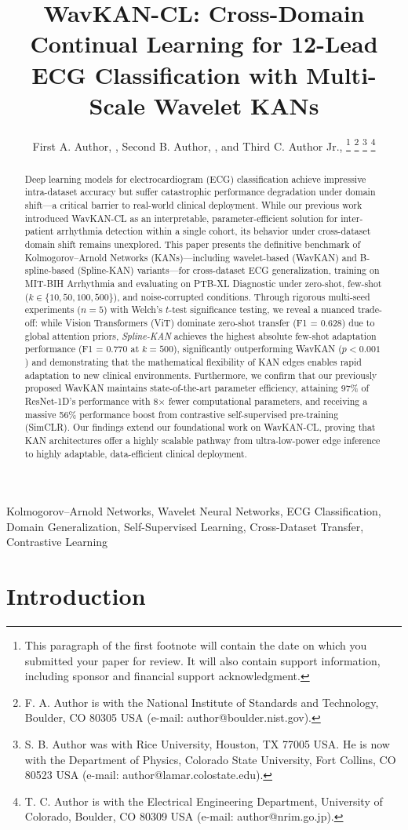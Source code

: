 \documentclass[journal,twoside,web]{ieeecolor}
\title{WavKAN-CL: Cross-Domain Continual Learning for 12-Lead ECG Classification with Multi-Scale Wavelet KANs}
\author{First A. Author, \IEEEmembership{Fellow, IEEE}, Second B. Author, \IEEEmembership{Member, IEEE}, and Third C. Author Jr., \IEEEmembership{Member, IEEE}
\thanks{This paragraph of the first footnote will contain the date on which you submitted your paper for review. It will also contain support information, including sponsor and financial support acknowledgment.}
\thanks{F. A. Author is with the National Institute of Standards and Technology, Boulder, CO 80305 USA (e-mail: author@boulder.nist.gov).}
\thanks{S. B. Author was with Rice University, Houston, TX 77005 USA. He is now with the Department of Physics, Colorado State University, Fort Collins, CO 80523 USA (e-mail: author@lamar.colostate.edu).}
\thanks{T. C. Author is with the Electrical Engineering Department, University of Colorado, Boulder, CO 80309 USA (e-mail: author@nrim.go.jp).}}
\begin{document}
\maketitle

\begin{abstract}
Deep learning models for electrocardiogram (ECG) classification achieve impressive intra-dataset accuracy but suffer catastrophic performance degradation under domain shift---a critical barrier to real-world clinical deployment. While our previous work introduced WavKAN-CL as an interpretable, parameter-efficient solution for inter-patient arrhythmia detection within a single cohort, its behavior under cross-dataset domain shift remains unexplored. This paper presents the definitive benchmark of Kolmogorov--Arnold Networks (KANs)---including wavelet-based (WavKAN) and B-spline-based (Spline-KAN) variants---for cross-dataset ECG generalization, training on MIT-BIH Arrhythmia and evaluating on PTB-XL Diagnostic under zero-shot, few-shot ($k \in \{10, 50, 100, 500\}$), and noise-corrupted conditions. Through rigorous multi-seed experiments ($n=5$) with Welch's $t$-test significance testing, we reveal a nuanced trade-off: while Vision Transformers (ViT) dominate zero-shot transfer (F1 = 0.628) due to global attention priors, \textit{Spline-KAN} achieves the highest absolute few-shot adaptation performance (F1 = 0.770 at $k=500$), significantly outperforming WavKAN ($p<0.001$) and demonstrating that the mathematical flexibility of KAN edges enables rapid adaptation to new clinical environments. Furthermore, we confirm that our previously proposed WavKAN maintains state-of-the-art parameter efficiency, attaining 97\% of ResNet-1D's performance with 8$\times$ fewer computational parameters, and receiving a massive 56\% performance boost from contrastive self-supervised pre-training (SimCLR). Our findings extend our foundational work on WavKAN-CL, proving that KAN architectures offer a highly scalable pathway from ultra-low-power edge inference to highly adaptable, data-efficient clinical deployment.
\end{abstract}

\begin{IEEEkeywords}
Kolmogorov--Arnold Networks, Wavelet Neural Networks, ECG Classification, Domain Generalization, Self-Supervised Learning, Cross-Dataset Transfer, Contrastive Learning
\end{IEEEkeywords}

\section{Introduction}
\end{document}
